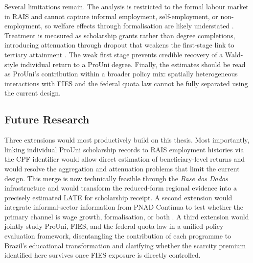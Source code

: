 Several limitations remain. The analysis is restricted to the formal labour market in RAIS and cannot capture informal employment, self-employment, or non-employment, so welfare effects through formalisation are likely understated \cite{EngbomEtAl2022}. Treatment is measured as scholarship grants rather than degree completions, introducing attenuation through dropout that weakens the first-stage link to tertiary attainment \cite{INEP2024}. The weak first stage prevents credible recovery of a Wald-style individual return to a ProUni degree. Finally, the estimates should be read as ProUni's contribution within a broader policy mix: spatially heterogeneous interactions with FIES and the federal quota law cannot be fully separated using the current design.

\subsection*{Future Research}

Three extensions would most productively build on this thesis. Most importantly, linking individual ProUni scholarship records to RAIS employment histories via the CPF identifier would allow direct estimation of beneficiary-level returns and would resolve the aggregation and attenuation problems that limit the current design. This merge is now technically feasible through the \emph{Base dos Dados} infrastructure \cite{Dahis2022, basedosdados.org} and would transform the reduced-form regional evidence into a precisely estimated LATE for scholarship receipt. A second extension would integrate informal-sector information from PNAD Cont\'inua to test whether the primary channel is wage growth, formalisation, or both \cite{IBGE2025NotasTecnicas}. A third extension would jointly study ProUni, FIES, and the federal quota law in a unified policy evaluation framework, disentangling the contribution of each programme to Brazil's educational transformation and clarifying whether the scarcity premium identified here survives once FIES exposure is directly controlled.
